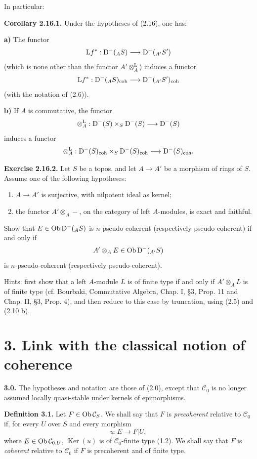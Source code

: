 \documentclass[11pt]{article}
\providecommand{\Ker}{\operatorname{Ker}}
\begin{document}
In particular:

\textbf{Corollary 2.16.1.} Under the hypotheses of (2.16), one has:

\textbf{a)} The functor
\[
  \mathrm L f^*: \mathrm D^-(_A S)\longrightarrow \mathrm D^-(_{A'}S')
\]
(which is none other than the functor \(A'\otimes_A^{\mathrm L}\)) induces a functor
\[
  \mathrm L f^*: \mathrm D^-(_A S)_{\mathrm{coh}}\longrightarrow \mathrm D^-(_{A'}S')_{\mathrm{coh}}
\]
(with the notation of (2.6)).

\textbf{b)} If \(A\) is commutative, the functor
\[
  \otimes_A^{\mathrm L}:\mathrm D^-(S)\times_S\mathrm D^-(S)
  \longrightarrow \mathrm D^-(S)
\]
induces a functor
\[
  \otimes_A^{\mathrm L}:\mathrm D^-(S)_{\mathrm{coh}}\times_S\mathrm D^-(S)_{\mathrm{coh}}
  \longrightarrow \mathrm D^-(S)_{\mathrm{coh}} .
\]

\textbf{Exercise 2.16.2.} Let \(S\) be a topos, and let \(A\to A'\) be a morphism of rings of \(S\). Assume one of the following hypotheses:
\begin{enumerate}[label=(\roman*)]
\item \(A\to A'\) is surjective, with nilpotent ideal as kernel;
\item the functor \(A'\otimes_A-\), on the category of left \(A\)-modules, is exact and faithful.
\end{enumerate}
Show that \(E\in\operatorname{Ob}\mathrm D^-(_A S)\) is \(n\)-pseudo-coherent (respectively pseudo-coherent) if and only if
\[
  A'\otimes_A E\in\operatorname{Ob}\mathrm D^-(_{A'}S)
\]
is \(n\)-pseudo-coherent (respectively pseudo-coherent).

Hints: first show that a left \(A\)-module \(L\) is of finite type if and only if \(A'\otimes_A L\) is of finite type (cf. Bourbaki, Commutative Algebra, Chap. I, §3, Prop. 11 and Chap. II, §3, Prop. 4), and then reduce to this case by truncation, using (2.5) and (2.10 b).

\section*{3. Link with the classical notion of coherence}

\textbf{3.0.} The hypotheses and notation are those of (2.0), except that \(\mathcal C_0\) is no longer assumed locally quasi-stable under kernels of epimorphisms.

\textbf{Definition 3.1.} Let \(F\in\operatorname{Ob}\mathcal C_S\). We shall say that \(F\) is \emph{precoherent} relative to \(\mathcal C_0\) if, for every \(U\) over \(S\) and every morphism
\[
  u:E\longrightarrow F|U,
\]
where \(E\in\operatorname{Ob}\mathcal C_{0,U}\), \(\Ker(u)\) is of \(\mathcal C_0\)-finite type (1.2). We shall say that \(F\) is \emph{coherent} relative to \(\mathcal C_0\) if \(F\) is precoherent and of finite type.
\end{document}
